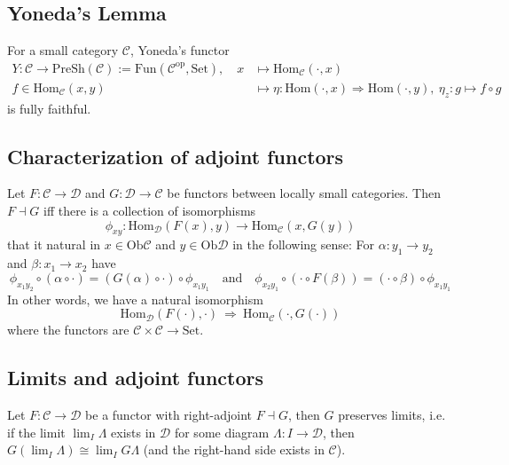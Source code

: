
\subsection{Yoneda's Lemma}
For a small category $\mathcal{C}$, Yoneda's functor
\begin{align*}
    Y: \mathcal{C} \to \mathrm{PreSh}(\mathcal{C}) := \mathrm{Fun}(\mathcal{C}^{\mathrm{op}}, \mathrm{Set}), \quad x &\mapsto \mathrm{Hom}_{\mathcal{C}}(\cdot, x) \\
    f \in \mathrm{Hom}_{\mathcal{C}}(x, y) &\mapsto \eta: \mathrm{Hom}(\cdot, x) \Rightarrow \mathrm{Hom}(\cdot, y), \ \eta_z: g \mapsto f \circ g
\end{align*}
is fully faithful.

\subsection{Characterization of adjoint functors}
Let $F: \mathcal{C} \to \mathcal{D}$ and $G: \mathcal{D} \to \mathcal{C}$ be functors between locally small categories.
Then $F \dashv G$ iff there is a collection of isomorphisms
\begin{equation*}
    \phi_{xy}: \mathrm{Hom}_{\mathcal{D}}(F(x), y) \to \mathrm{Hom}_{\mathcal{C}}(x, G(y))
\end{equation*}
that it natural in $x \in \mathrm{Ob}\mathcal{C}$ and $y \in \mathrm{Ob}\mathcal{D}$ in the following sense:
For $\alpha: y_1 \to y_2$ and $\beta: x_1 \to x_2$ have
\begin{equation*}
    \phi_{x_1 y_2} \circ (\alpha \circ \cdot) = (G(\alpha) \circ \cdot) \circ \phi_{x_1 y_1} \quad \text{and} \quad \phi_{x_2 y_1} \circ (\cdot \circ F(\beta)) = (\cdot \circ \beta) \circ \phi_{x_1 y_1}
\end{equation*}
In other words, we have a natural isomorphism
\begin{equation*}
    \mathrm{Hom}_{\mathcal{D}}(F(\cdot), \cdot) \ \Rightarrow \ \mathrm{Hom}_{\mathcal{C}}(\cdot, G(\cdot))
\end{equation*}
where the functors are $\mathcal{C} \times \mathcal{C} \to \mathrm{Set}$.

\subsection{Limits and adjoint functors}
Let $F: \mathcal{C} \to \mathcal{D}$ be a functor with right-adjoint $F \dashv G$, then $G$ preserves limits, i.e. if the limit $\lim_I \Lambda$ exists in $\mathcal{D}$ for some diagram $\Lambda: I \to \mathcal{D}$, then $G(\lim_I \Lambda) \cong \lim_I G \Lambda$ (and the right-hand side exists in $\mathcal{C}$). 
